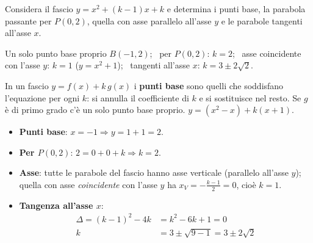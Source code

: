 \begin{question}[ID=5.3, subtitle={Fascio $y=x^2+(k-1)x+k$: punti base e proprietà}, difficulty=media, tags={parabola, fasci}]
Considera il fascio $y=x^2+(k-1)x+k$ e determina i punti base, la parabola passante per $P(0,2)$, quella con asse parallelo all'asse $y$ e le parabole tangenti all'asse $x$.
\begin{solution}
Un solo punto base proprio $B(-1,2)$; \ per $P(0,2)$: $k=2$; \ asse coincidente con l'asse $y$: $k=1$ ($y=x^2+1$); \ tangenti all'asse $x$: $k=3\pm2\sqrt2$.
\end{solution}
\begin{explanation}
In un fascio $y=f(x)+k\,g(x)$ i \textbf{punti base} sono quelli che soddisfano l'equazione per ogni $k$: si annulla il coefficiente di $k$ e si sostituisce nel resto. Se $g$ è di primo grado c'è un solo punto base proprio.
$y=(x^2-x)+k(x+1)$.
\begin{itemize}
    \item \textbf{Punti base}: $x=-1 \Rightarrow y=1+1=2$.
    \item \textbf{Per $P(0,2)$}: $2=0+0+k \Rightarrow k=2$.
    \item \textbf{Asse}: tutte le parabole del fascio hanno asse verticale (parallelo all'asse $y$); quella con asse \emph{coincidente} con l'asse $y$ ha $x_V=-\tfrac{k-1}{2}=0$, cioè $k=1$.
    \item \textbf{Tangenza all'asse $x$}:
    \[\begin{aligned}
    \Delta=(k-1)^2-4k &= k^2-6k+1=0\\
    k &= 3\pm\sqrt{9-1}=3\pm2\sqrt2
    \end{aligned}\]
\end{itemize}
\end{explanation}
\end{question}


